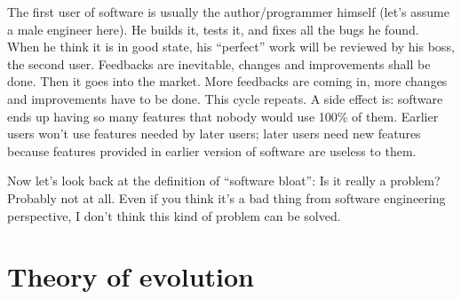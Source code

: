 \documentclass[a4paper, 11pt]{article}
\begin{document}
The first user of software is usually the author/programmer himself
(let's assume a male engineer here). He builds it, tests it, and fixes
all the bugs he found. When he think it is in good state, his
``perfect'' work will be reviewed by his boss, the second
user. Feedbacks are inevitable, changes and improvements shall be
done. Then it goes into the market. More feedbacks are coming in, more
changes and improvements have to be done. This cycle repeats. A side
effect is: software ends up having so many features that nobody would
use 100\% of them. Earlier users won't use features needed by later
users; later users need new features because features provided in
earlier version of software are useless to them.

Now let's look back at the definition of ``software bloat'': Is it
really a problem? Probably not at all. Even if you think it's a bad
thing from software engineering perspective, I don't think this kind
of problem can be solved.

\section*{Theory of evolution}
\end{document}
